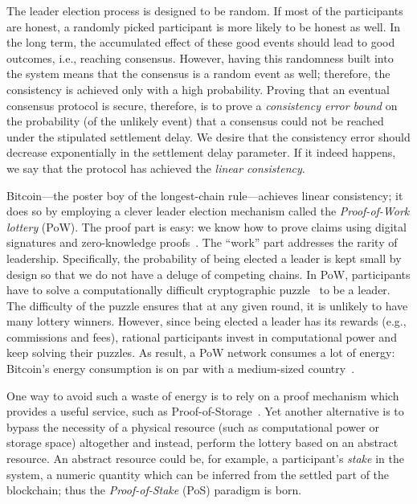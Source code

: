 The leader election process is designed to be random. 
If most of the participants are honest, 
a randomly picked participant is more likely to be honest as well. 
In the long term, the accumulated effect of these good events 
should lead to good outcomes, i.e., reaching consensus. 
However, having this randomness built into the system means 
that the consensus is a random event as well; 
therefore, the consistency is achieved only with a high probability. 
Proving that an eventual consensus protocol is secure, 
therefore, is to prove a 
\emph{consistency error bound} 
on the probability (of the unlikely event) that a consensus could not be reached 
under the stipulated settlement delay. 
We desire that the consistency error should decrease exponentially 
in the settlement delay parameter. 
If it indeed happens, 
we say that the protocol has achieved the \emph{linear consistency}.

Bitcoin---the poster boy of the longest-chain rule---achieves 
linear consistency; it does so by employing a clever leader election mechanism 
called the \emph{Proof-of-Work lottery} (PoW). 
The proof part is easy: we know how to prove claims using 
digital signatures and zero-knowledge proofs~\cite {DigitalSignatures,ZK}. 
The ``work'' part addresses the rarity of leadership. 
Specifically, 
the probability of being elected a leader is kept small by design 
so that we do not have a deluge of competing chains. 
In PoW, participants have to solve a computationally difficult 
cryptographic puzzle~\cite{PoW} 
to be a leader. 
The difficulty of the puzzle ensures that at any given round, 
it is unlikely to have many lottery winners. 
However, since being elected a leader has its rewards (e.g., commissions and fees), 
rational participants invest in computational power 
and keep solving their puzzles. 
As result, a PoW network consumes a lot of energy: 
Bitcoin's energy consumption is 
on par with a medium-sized country~\cite{BitcoinEnergy}.

One way to avoid such a waste of energy 
is to rely on a proof mechanism which provides 
a useful service, such as Proof-of-Storage~\cite{ProofOfStorage}. 
Yet another alternative is to bypass the necessity of a physical resource 
(such as computational power or storage space)
altogether and instead, perform the lottery based on an abstract resource. 
An abstract resource could be, for example, 
a participant's \emph{stake} in the system, 
a numeric quantity which can be inferred 
from the settled part of the blockchain; 
thus the \emph{Proof-of-Stake} (PoS) paradigm is born.

